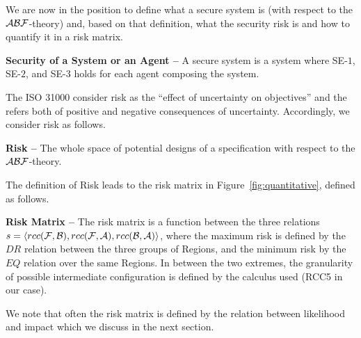 We are now in the position to define what a secure system is (with respect to the $\mathcal{A}\mathcal{B}\mathcal{F}$-theory) 
and, based on that definition, what the security risk is and how to quantify it in a risk matrix.
\begin{definition}{\bf Security of a System or an Agent --}\label{def:security}
	A secure system is a system where SE-$1$, SE-$2$, and SE-$3$ holds for each 
	agent composing the system.
\end{definition}
The ISO 31000 consider risk as the ``effect of uncertainty on objectives'' and the refers
both of positive and negative consequences of uncertainty. Accordingly, we consider
risk as follows. 
\begin{definition}{\bf Risk --}
The whole space of potential designs of a specification with respect to the
$\mathcal{A}\mathcal{B}\mathcal{F}$-theory.
\end{definition}
The definition of Risk leads to the risk matrix in Figure~\ref{fig:quantitative}, defined as follows.
\begin{definition}{\bf Risk Matrix --}
	The risk matrix is a function between the three relations 
	$s=\langle rcc(\mathcal{F},\mathcal{B}),rcc(\mathcal{F},\mathcal{A}),rcc(\mathcal{B},\mathcal{A})\rangle$,
	where the maximum risk is defined by the $DR$ relation between the three groups of Regions, and the 
	minimum risk by the $EQ$ relation over the same Regions. In between the two extremes, the granularity
	of possible intermediate configuration is defined by the calculus used (RCC5 in our case).
\end{definition}
We note that often the risk matrix is defined by the relation between likelihood and impact which we
discuss in the next section.

